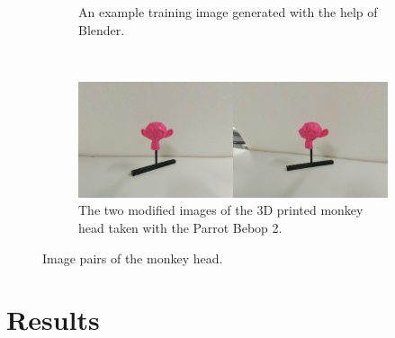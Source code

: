 \begin{figure}[h!]
\begin{subfigure}[t]{\textwidth}
		\caption{An example training image generated with the help of Blender.}
	\end{subfigure}
	~ 
	\begin{subfigure}[t]{\textwidth}
		\centering
		\includegraphics[width=\textwidth]{img/experiment2_environment_comparison_1.jpg}
		\caption{The two modified images of the 3D printed monkey head taken with the Parrot Bebop 2.}
	\end{subfigure}
	\caption{Image pairs of the monkey head.}
	\label{pic:experiment2_environment_comparison}
\end{figure}

\section{Results}

\filbreak